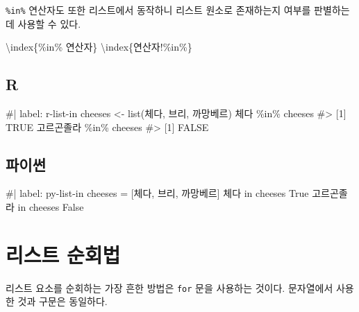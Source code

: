 \documentclass[
  letterpaper,
]{book}
\newenvironment{Shaded}{\begin{snugshade}}{\end{snugshade}}
\newcommand{\NormalTok}[1]{\textcolor[rgb]{0.00,0.23,0.31}{#1}}
\begin{document}
\texttt{\%in\%} 연산자도 또한 리스트에서 동작하니 리스트 원소로
존재하는지 여부를 판별하는 데 사용할 수 있다.

  
\textbackslash index\{\%in\% 연산자\}
\textbackslash index\{연산자!\%in\%\}

\subsection{R}

\begin{Shaded}
\begin{Highlighting}[]
\NormalTok{\#| label: r{-}list{-}in}
\NormalTok{cheeses \textless{}{-} list(\textquotesingle{}체다\textquotesingle{}, \textquotesingle{}브리\textquotesingle{}, \textquotesingle{}까망베르\textquotesingle{})}
\NormalTok{\textquotesingle{}체다\textquotesingle{} \%in\% cheeses}
\NormalTok{\#\textgreater{} [1] TRUE}
\NormalTok{\textquotesingle{}고르곤졸라\textquotesingle{} \%in\% cheeses}
\NormalTok{\#\textgreater{} [1] FALSE}
\end{Highlighting}
\end{Shaded}

\subsection{파이썬}

\begin{Shaded}
\begin{Highlighting}[]
\NormalTok{\#| label: py{-}list{-}in}
\NormalTok{cheeses = [\textquotesingle{}체다\textquotesingle{}, \textquotesingle{}브리\textquotesingle{}, \textquotesingle{}까망베르\textquotesingle{}]}
\NormalTok{\textquotesingle{}체다\textquotesingle{} in cheeses}
\NormalTok{True}
\NormalTok{\textquotesingle{}고르곤졸라\textquotesingle{} in cheeses}
\NormalTok{False}
\end{Highlighting}
\end{Shaded}

\section{리스트 순회법}\label{r-list-traversal}

  
 

리스트 요소를 순회하는 가장 흔한 방법은 \texttt{for} 문을 사용하는
것이다. 문자열에서 사용한 것과 구문은 동일하다.
\end{document}
